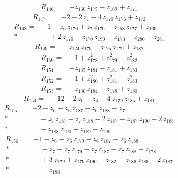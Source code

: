 \documentclass[10pt]{article}
\begin{document}
\begin{align*}
R_{146}={}& - z_{130}\,z_{175} - z_{169} + z_{171}
\end{align*}
\begin{align*}
R_{147}={}& - 2 - 2\,z_{1} - 4\,z_{170}\,z_{176} + z_{172}
\end{align*}
\begin{align*}
R_{148}={}& - 1 + z_{6}\,z_{170} + z_{7}\,z_{170} - z_{158}\,z_{177} + z_{169} \\*
&\quad + 2\,z_{170} + z_{170}\,z_{190} - z_{173} - z_{280} - z_{281}
\end{align*}
\begin{align*}
R_{149}={}& - z_{124}\,z_{179} - z_{125}\,z_{179} + z_{182}
\end{align*}
\begin{align*}
R_{150}={}& - 1 + z_{178}^{2} + z_{179}^{2} - z_{182}^{2}
\end{align*}
\begin{align*}
R_{151}={}& - z_{135}\,z_{181} - z_{181} + z_{183}
\end{align*}
\begin{align*}
R_{152}={}& - 1 + z_{180}^{2} + z_{181}^{2} - z_{183}^{2}
\end{align*}
\begin{align*}
R_{153}={}& - z_{130}\,z_{184} - z_{178} + z_{180}
\end{align*}
\begin{align*}
R_{154}={}& - 12 - 2\,z_{0} - z_{4} - 4\,z_{179}\,z_{185} + z_{181}
\end{align*}
\begin{align*}
R_{155}={}& - 2 - z_{6} - z_{6}\,z_{187} - z_{6}\,z_{188} - z_{7} \\*
&\quad - z_{7}\,z_{187} - z_{7}\,z_{188} - 2\,z_{187} - z_{187}\,z_{190} - 2\,z_{188} \\*
&\quad - z_{188}\,z_{190} + z_{189} - z_{190}
\end{align*}
\begin{align*}
R_{156}={}& - 1 - z_{6} + z_{6}\,z_{179} - z_{6}\,z_{187} - z_{6}\,z_{188} \\*
&\quad - z_{7} + z_{7}\,z_{179} - z_{7}\,z_{187} - z_{7}\,z_{188} + z_{178} \\*
&\quad + 3\,z_{179} + z_{179}\,z_{190} - z_{182} - z_{186}\,z_{189} - 2\,z_{187} \\*
&\quad - z_{188}
\end{align*}
\end{document}
